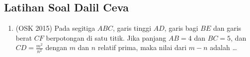 \subsection{Latihan Soal Dalil Ceva}
\begin{enumerate}
    \item (OSK 2015) Pada segitiga $ABC$, garis tinggi $AD$, garis bagi $BE$ dan garis berat $CF$ berpotongan di satu titik. Jika panjang $AB = 4$ dan $BC = 5$, dan $CD = \frac{m^2}{n^2}$ dengan $m$ dan $n$ relatif prima, maka nilai dari $m - n$ adalah \ldots
\end{enumerate}
